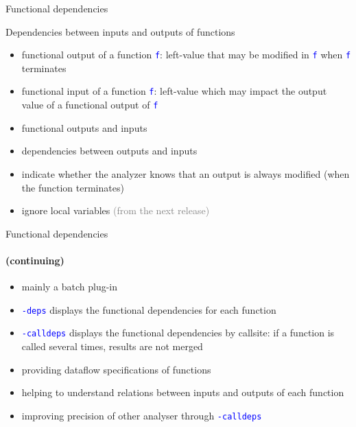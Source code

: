\documentclass{beamer}
\newcommand{\orange}[1]{{\textcolor{frama-c-1}{#1}}}
\newcommand{\orangepale}[1]{{\textcolor{frama-c-2}{#1}}}
\newcommand{\vvert}[1]{{\textcolor{vert}{#1}}}
\newcommand{\bleu}[1]{{\textcolor{blue}{#1}}}
\newcommand{\gris}[1]{{\textcolor{gray}{#1}}}
\newcommand{\goup}{\vspace{-5pt}}
\newcommand{\code}[1]{\bleu{\texttt{#1}}}
\newcommand{\comment}[1]{\gris{(#1)}}
\newcommand{\continuing}{\framesubtitle{(continuing)}}
\newcommand{\intro}[1]{\begin{center}\vvert{#1}\end{center}}
\newenvironment{sect}[1]{\orange{#1}\begin{itemize}}{\end{itemize}}
\newenvironment{features}{\begin{sect}{Features}}{\end{sect}}
\newenvironment{whatitisgoodfor}{\begin{sect}{What is it good for}}{\end{sect}}
\newenvironment{howtouse}{\begin{sect}{How to use}}{\end{sect}}
\begin{document}
\begin{frame}{Functional dependencies}

\goup
\intro{Dependencies between inputs and outputs of functions}
\goup

\begin{sect}{Definitions}
\item \orangepale{functional output} of a function \code{f}: left-value that
  may be modified in \code{f} when \code{f} terminates
\item \orangepale{functional input} of a function \code{f}: left-value which
  may impact the output value of a functional output of \code{f}
\end{sect}\smallskip

\begin{features}
\item functional outputs and inputs 
\item dependencies between outputs and inputs
\item indicate whether the analyzer knows that an output is always modified
  (when the function terminates)
\item ignore local variables \comment{from the next release}
\end{features}

\end{frame}


\begin{frame}{Functional dependencies}
\continuing

\begin{howtouse}
\item mainly a batch plug-in
\item \code{-deps} displays the functional dependencies for each
  function
\item \code{-calldeps} displays the functional dependencies by callsite: if a
  function is called several times, results are not merged
\end{howtouse}\medskip

\begin{whatitisgoodfor}
\item providing dataflow specifications of functions
\item helping to understand relations between inputs and outputs of each
  function
\item improving precision of other analyser through \code{-calldeps}
\end{whatitisgoodfor}

\end{frame}
\end{document}
